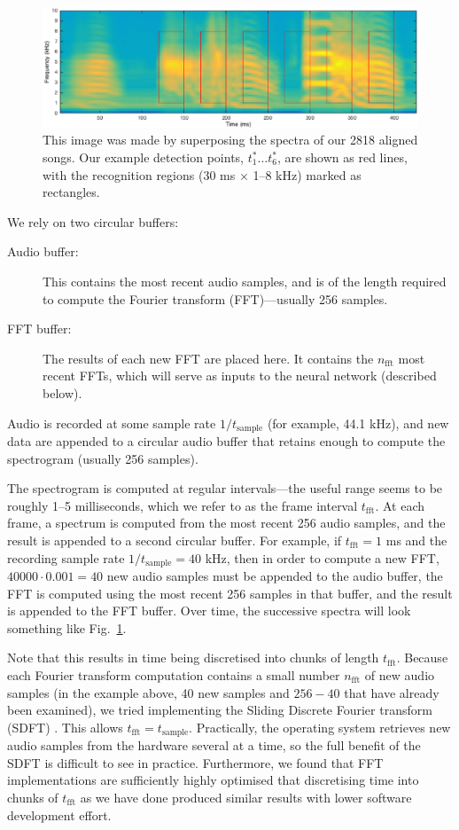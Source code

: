 \documentclass[10pt,letterpaper]{article}
\newcommand\fig[1]{Fig.~\ref{#1}}
\begin{document}
\begin{figure}
  \includegraphics[width=\textwidth]{6syllables}
  \caption{This image was made by superposing the spectra of our 2818 aligned songs.  Our example detection points, $t^*_1\ldots t^*_6$, are shown as red lines, with the recognition regions (30 ms $\times$ 1--8 kHz) marked as rectangles.}
  \label{fig:song}
\end{figure}

We rely on two circular buffers:
\begin{description}
\item[Audio buffer:] This contains the most recent audio samples, and is of the length required to compute the Fourier transform (FFT)---usually 256 samples.
\item[FFT buffer:] The results of each new FFT are placed here.  It contains the $n_\textrm{fft}$ most recent FFTs, which will serve as inputs to the neural network (described below).
\end{description}

Audio is recorded at some sample rate $1/t_\mathrm{sample}$ (for example, 44.1 kHz), and new data are appended to a circular audio buffer that retains enough to compute the spectrogram (usually 256 samples).

The spectrogram is computed at regular intervals---the useful range
seems to be roughly 1--5 milliseconds, which we refer to as the frame
interval $t_\textrm{fft}$.  At each frame, a spectrum is computed from the
most recent 256 audio samples, and the result is appended to a second circular buffer.  For example, if $t_\textrm{fft}=1$ ms and the recording sample rate $1/t_\textrm{sample}=40$ kHz, then in order to compute a new FFT, $40000\cdot 0.001=40$ new audio samples must be appended to the audio buffer, the FFT is computed using the most recent 256 samples in that buffer, and the result is appended to the FFT buffer.  Over time, the successive spectra will look something
like \fig{fig:song}.

Note that this results in time being discretised into chunks of length
$t_\mathrm{fft}$.  Because each Fourier transform computation contains
a small number $n_\mathrm{fft}$ of new audio samples (in the example
above, 40 new samples and $256-40$ that have already been examined),
we tried implementing the Sliding Discrete Fourier transform (SDFT)
\cite{Jacobsen2003SlidingDFT}.  This allows
$t_\textrm{fft}=t_\textrm{sample}$.  Practically, the operating system
retrieves new audio samples from the hardware several at a time, so
the full benefit of the SDFT is difficult to see in practice.
Furthermore, we found that FFT implementations are sufficiently highly
optimised that discretising time into chunks of $t_\mathrm{fft}$ as we
have done produced similar results with lower software development
effort.
\end{document}
